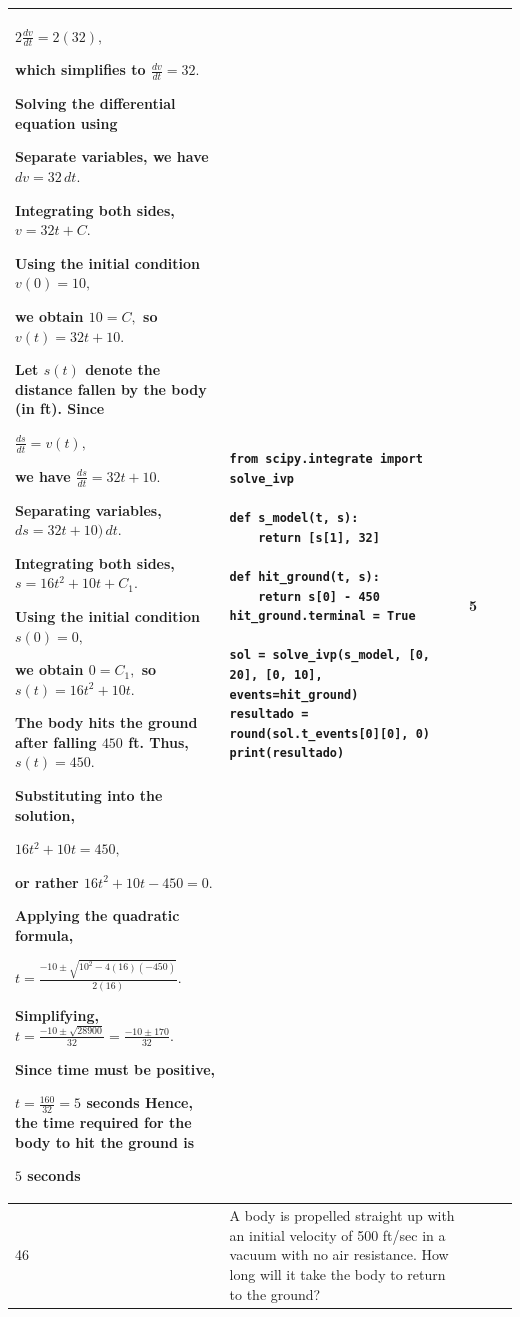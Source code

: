 \documentclass[a4paper,12pt]{article}
\begin{document}
\begin{longtable}{|p{0.3cm}|p{}|p{10cm}|p{}|p{1.5cm}|}
$2\frac{dv}{dt}=2(32),$

which simplifies to $\frac{dv}{dt}=32.$

Solving the differential equation using

Separate variables, we have $dv=32\,dt.$

Integrating both sides, $v=32t+C.$

Using the initial condition $v(0)=10,$

we obtain $10=C,$ so $v(t)=32t+10.$

Let $s(t)$ denote the distance fallen by the body (in ft). Since

$\frac{ds}{dt}=v(t),$

we have $\frac{ds}{dt}=32t+10.$

Separating variables, $ds=32t+10)\,dt.$

Integrating both sides, $s=16t^2+10t+C_1.$

Using the initial condition $s(0)=0,$

we obtain $0=C_1,$ so $s(t)=16t^2+10t.$

The body hits the ground after falling $450$ ft. Thus, $s(t)=450.$

Substituting into the solution,

$16t^2+10t=450,$

or rather $16t^2+10t-450=0.$

Applying the quadratic formula,

$t=\frac{-10\pm\sqrt{10^2-4(16)(-450)}}{2(16)}.$

Simplifying, $t=\frac{-10\pm\sqrt{28900}}{32}=\frac{-10\pm170}{32}.$

Since time must be positive,

$t=\frac{160}{32}=5 $ seconds
Hence, the time required for the body to hit the ground is

$5$ seconds &\begin{verbatim}
from scipy.integrate import solve_ivp

def s_model(t, s):
    return [s[1], 32]

def hit_ground(t, s):
    return s[0] - 450
hit_ground.terminal = True

sol = solve_ivp(s_model, [0, 20], [0, 10], events=hit_ground)
resultado = round(sol.t_events[0][0], 0)
print(resultado)
\end{verbatim}& 5   \\ \hline 
46            &A body is propelled straight up with an initial velocity of 500 ft/sec in a vacuum with no air resistance. How long
will it take the body to return to the ground?



\end{longtable}
\end{document}
